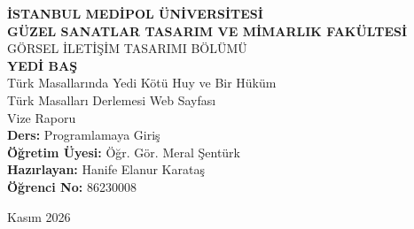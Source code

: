 \documentclass[11pt,a4paper]{article}
\begin{document}
\begin{titlepage}
    \centering
    \vspace*{2cm}
    
    {\Large \textbf{İSTANBUL MEDİPOL ÜNİVERSİTESİ}}\\[0.3cm]
    {\large \textbf{GÜZEL SANATLAR TASARIM VE MİMARLIK FAKÜLTESİ}}\\[0.2cm]
    {\large GÖRSEL İLETİŞİM TASARIMI BÖLÜMÜ}\\[2.5cm]
    
    {\Huge \textbf{YEDİ BAŞ}}\\[0.6cm]
    {\LARGE Türk Masallarında Yedi Kötü Huy ve Bir Hüküm}\\[0.4cm]
    {\large Türk Masalları Derlemesi Web Sayfası}\\[0.2cm]
    {\large Vize Raporu}\\[2.5cm]
    
    \textbf{Ders:} Programlamaya Giriş\\[0.2cm]
    \textbf{Öğretim Üyesi:} Öğr. Gör. Meral Şentürk\\[1.5cm]
    
    \textbf{Hazırlayan:} Hanife Elanur Karataş\\[0.2cm]
    \textbf{Öğrenci No:} 86230008\\[2cm]
    
    \begin{center}
    \end{center}
    
    \vfill
    {\large Kasım 2026}
\end{titlepage}

\newpage
\tableofcontents
\newpage
\end{document}
